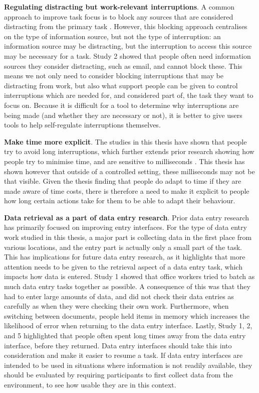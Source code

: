 \textbf{Regulating distracting but work-relevant interruptions}. A common approach to improve task focus is to block any sources that are considered distracting from the primary task \citep{Kim2017, Mark2018}. However, this blocking approach centralises on the type of information source, but not the type of interruption: an information source may be distracting, but the interruption to access this source may be necessary for a task. Study 2 showed that people often need information sources they consider distracting, such as email, and cannot block these. This means we not only need to consider blocking interruptions that may be distracting from work, but also what support people can be given to control interruptions which are needed for, and considered part of, the task they want to focus on. Because it is difficult for a tool to determine why interruptions are being made (and whether they are necessary or not), it is better to give users tools to help self-regulate interruptions themselves. 


\textbf{Make time more explicit}. The studies in this thesis have shown that people try to avoid long interruptions, which further extends prior research showing how people try to minimise time, and are sensitive to milliseconds \citep{Gray2006}. This thesis has shown however that outside of a controlled setting, these milliseconds may not be that visible. Given the thesis finding that people do adapt to time if they are made aware of time costs, there is therefore a need to make it explicit to people how long certain actions take for them to be able to adapt their behaviour.

\textbf{Data retrieval as a part of data entry research}. Prior data entry research has primarily focused on improving entry interfaces. For the type of data entry work studied in this thesis, a major part is collecting data in the first place from various locations, and the entry part is actually only a small part of the task. This has implications for future data entry research, as it highlights that more attention needs to be given to the retrieval aspect of a data entry task, which impacts how data is entered. Study 1 showed that office workers tried to batch as much data entry tasks together as possible. A consequence of this was that they had to enter large amounts of data, and did not check their data entries as carefully as when they were checking their own work. Furthermore, when switching between documents, people held items in memory which increases the likelihood of error when returning to the data entry interface. Lastly, Study 1, 2, and 5 highlighted that people often spent long times away from the data entry interface, before they returned. Data entry interfaces should take this into consideration and make it easier to resume a task. If data entry interfaces are intended to be used in situations where information is not readily available, they should be evaluated by requiring participants to first collect data from the environment, to see how usable they are in this context.

